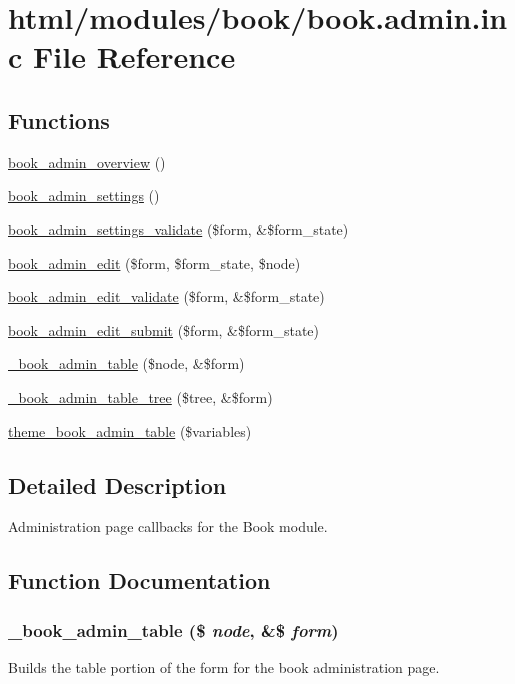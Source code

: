 \hypertarget{book_8admin_8inc}{
\section{html/modules/book/book.admin.inc File Reference}
\label{book_8admin_8inc}
}
\subsection*{Functions}
\begin{DoxyCompactItemize}
\item 
\hyperlink{book_8admin_8inc_a8157d71732b3c171a9328b73059f2716}{book\_\-admin\_\-overview} ()
\item 
\hyperlink{group__forms_ga036f1d2ed17d79b71545c955c864cf2e}{book\_\-admin\_\-settings} ()
\item 
\hyperlink{book_8admin_8inc_a18c68be0c946b1fdf59bed35fc266d60}{book\_\-admin\_\-settings\_\-validate} (\$form, \&\$form\_\-state)
\item 
\hyperlink{group__forms_gac3a5a2ff41875baa73d6af357cf328e6}{book\_\-admin\_\-edit} (\$form, \$form\_\-state, \$node)
\item 
\hyperlink{book_8admin_8inc_ae92ff3db1b9b0f3a9832e1db72d5faec}{book\_\-admin\_\-edit\_\-validate} (\$form, \&\$form\_\-state)
\item 
\hyperlink{book_8admin_8inc_af0fb9b52db15bf3bc44c63d5b9042c69}{book\_\-admin\_\-edit\_\-submit} (\$form, \&\$form\_\-state)
\item 
\hyperlink{book_8admin_8inc_a5a76c710890bc8a1bf273f7a56a82830}{\_\-book\_\-admin\_\-table} (\$node, \&\$form)
\item 
\hyperlink{book_8admin_8inc_a67224aa7f69e5f25baca3d08b4b7dc5c}{\_\-book\_\-admin\_\-table\_\-tree} (\$tree, \&\$form)
\item 
\hyperlink{group__themeable_gad9629dbe505d7b381ba96e62496035bc}{theme\_\-book\_\-admin\_\-table} (\$variables)
\end{DoxyCompactItemize}


\subsection{Detailed Description}
Administration page callbacks for the Book module. 

\subsection{Function Documentation}
\hypertarget{book_8admin_8inc_a5a76c710890bc8a1bf273f7a56a82830}{
\subsubsection[{\_\-book\_\-admin\_\-table}]{\setlength{\rightskip}{0pt plus 5cm}\_\-book\_\-admin\_\-table (\$ {\em node}, \/  \&\$ {\em form})}}
\label{book_8admin_8inc_a5a76c710890bc8a1bf273f7a56a82830}
Builds the table portion of the form for the book administration page.


